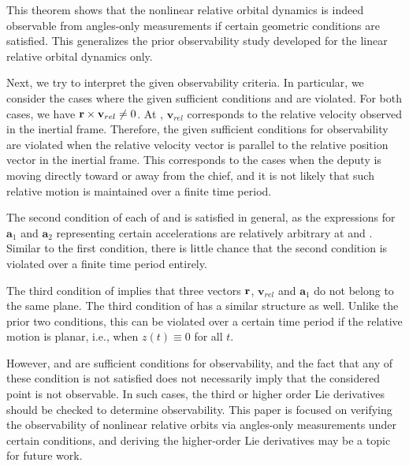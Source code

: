 This theorem shows that the nonlinear relative orbital dynamics is indeed observable from angles-only measurements if certain geometric conditions are satisfied. This generalizes the prior observability study developed for the linear relative orbital dynamics only.

Next, we try to interpret the given observability criteria. In particular, we consider the cases where the given sufficient conditions  and  are violated. For both cases, we have $\mathbf{r}\times\mathbf{v}_{rel}\neq 0$. At , $\mathbf{v}_{rel}$ corresponds to the relative velocity observed in the inertial frame. Therefore, the given sufficient conditions for observability are violated when the relative velocity vector is parallel to the relative position vector in the inertial frame. This corresponds to the cases when the deputy is moving directly toward or away from the chief, and it is not likely that such relative motion is maintained over a finite time period.  

The second condition of each of  and  is satisfied in general, as the expressions for $\mathbf{a}_1$ and $\mathbf{a}_2$ representing certain accelerations are relatively arbitrary at  and . Similar to the first condition, there is little chance that the second condition is violated over a finite time period entirely.

The third condition of  implies that three vectors $\mathbf{r}$, $\mathbf{v}_{rel}$ and $\mathbf{a}_1$ do not belong to the same plane. The third condition of  has a similar structure as well. Unlike the prior two conditions, this can be violated over a certain time period if the relative motion is planar, i.e., when $z(t)\equiv 0$ for all $t$. 

However,  and  are sufficient conditions for observability, and the fact that any of these condition is not satisfied does not necessarily imply that the considered point is not observable. In such cases, the third or higher order Lie derivatives should be checked to determine observability. This paper is focused on verifying the observability of nonlinear relative orbits via angles-only measurements under certain conditions, and deriving the higher-order Lie derivatives may be a topic for future work.





